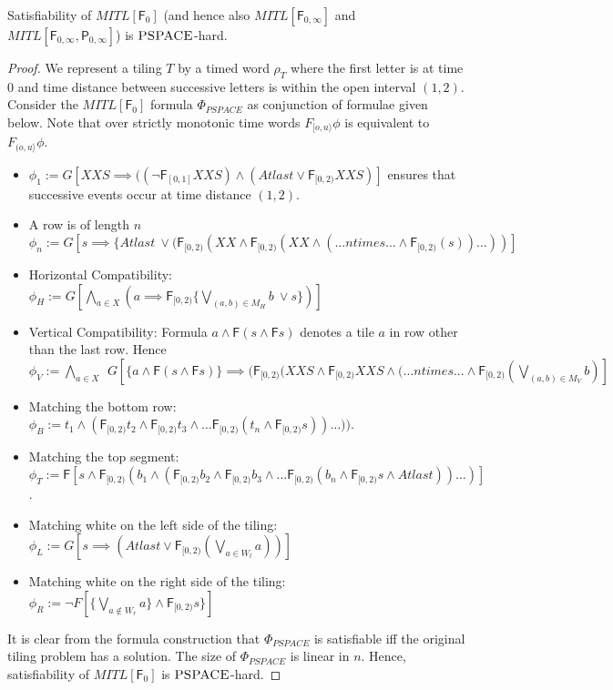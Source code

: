 \documentclass{llncs}
\newcommand{\class}{\textsc}
\newcommand{\fut}{\textsf{F}}
\newcommand{\past}{\textsf{P}}
\newcommand{\mitlfpzinf}{\mbox{$\mathit{MITL[\fut_{0,\infty},\past_{0,\infty}]}$}}
\newcommand{\mitlfzinf}{\mbox{$\mathit{MITL[\fut_{0,\infty}]}$}}
\newcommand{\mitlfz}{\mbox{$\mathit{MITL[\fut_{0}]}$}}
\newcommand{\pspace}{\mbox{$\class{PSPACE}$}}
\begin{document}
\begin{theorem} \label{theo:pspacehard} 
Satisfiability of $\mitlfz$ (and hence also $\mitlfzinf$ and $\mitlfpzinf$) is \pspace-hard.
\end{theorem}
\begin{proof}
We represent a tiling $T$ by a timed word $\rho_T$ where the first letter is at time $0$ and time distance between successive letters is within the open interval $(1,2)$. Consider the $\mitlfz$ formula $\Phi_{PSPACE}$ as conjunction of formulae given below. Note that over strictly monotonic time words $F_{[o,u\rangle} \phi$ is equivalent to $F_{(o,u\rangle} \phi$.
 \begin{itemize}
 \item $\phi_1 := G[XXS \implies ((\neg\fut_{[0,1]}XXS) \land (Atlast \lor \fut_{[0,2)}XXS)]$ ensures that successive events occur at time distance $(1,2)$.
 \item A row is of length $n$ \\
$\phi_n := G[s\implies \{Atlast ~ \lor 
(\fut_{[0,2)} (XX \land \fut_{[0,2)} (XX \land  (\ldots n times \ldots \land \fut_{[0,2)}(s))\dots))]$
\item
 Horizontal Compatibility: $\phi_H := G[\bigwedge\limits_{a\in X} (a \implies
  \fut_{[0,2)}\{\bigvee\limits_{(a,b) \in M_H} b ~\lor s\})]$
 \item
 Vertical Compatibility:  Formula $a \land \fut (s \land \fut s)$  denotes a tile $a$ in  row other than the last row. Hence \\
  $\phi_V := \bigwedge\limits_{a\in X}~~G [
 \{a\land \fut(s\land\fut s)\}   \implies (\fut_{[0,2)} (XXS \land \fut_{[0,2)} XXS \land ( \ldots n times... \land\fut_{[0,2)}(\bigvee\limits_{(a,b)\in M_V} b)] $
 \item Matching the bottom row:\\
   $\phi_B := t_1 \land (\fut_{[0,2)} t_2 \land \fut_{[0,2)} t_3 \land \ldots  \fut_{[0,2)} (t_n \land \fut_{[0,2)} s)) \ldots ))$.
 \item Matching the top segment:\\
   $\phi_T :=\fut[ s \land \fut_{[0,2)} (
    b_1 \land (\fut_{[0,2)} b_2 \land \fut_{[0,2)} b_3 \land \ldots  
    \fut_{[0,2)} (b_n \land \fut_{[0,2)} s \land Atlast)) \ldots )]$.
 \item Matching white on the left side of the tiling:\\
  $\phi_L :=G[s\implies (Atlast \lor \fut_{[0,2)}(\bigvee\limits_{a\in W_l} a))]$
 \item Matching white on the right side of the tiling:\\
 $\phi_R:= \neg  F[\{\bigvee\limits_{a\not\in  W_r} a\} \land \fut_{[0,2)} s\}]$
\end{itemize}  
It is clear from the formula construction that  $\Phi_{PSPACE}$
is satisfiable iff the original tiling problem has a solution. The size of $\Phi_{PSPACE}$ is linear in $n$. Hence, satisfiability of $\mitlfz$ is 
\pspace-hard. 
\end{proof}
\end{document}
